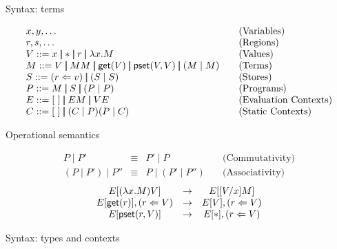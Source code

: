 \documentclass[11pt]{article}
\newcommand{\arrow}{\rightarrow}        \newcommand{\trarrow}{\stackrel{*}{\rightarrow}}        \newcommand{\limp}{\multimap} \newcommand{\bang}{\oc}
\newcommand{\pst}[2]{{\sf pset}(#1,#2)}
\newcommand{\get}[1]{{\sf get}(#1)}
\newcommand{\pstore}[2]{(#1 \Leftarrow #2)}
\begin{document}
\begin{table}
{\footnotesize
\begin{center}
{\sc Syntax: terms}
\end{center}
\[
\begin{array}{ll}

x,y,\ldots         
&\mbox{(Variables)} \\

r,s,\ldots         
&\mbox{(Regions)} \\

V::= x \Alt * \Alt r \Alt \lambda x.M
&\mbox{(Values)} \\

M::= V \Alt MM \Alt \get{V} \Alt \pst{V}{V} 
\Alt (M \mid M)\quad &\mbox{(Terms)} \\

S::= \pstore{r}{v} \Alt (S \mid S) &\mbox{(Stores)} \\

P::= M \Alt S \Alt (P\mid P) &\mbox{(Programs)}  \\

E::= [~] \Alt EM \Alt VE  &\mbox{(Evaluation Contexts)} \\

C::= [~] \Alt (C \mid P)  (P\mid C) &\mbox{(Static Contexts)}   

\end{array}
\]
\begin{center}
{\sc Operational semantics}
\end{center}
\[
\begin{array}{cccc}

P\mid P' &\equiv  &P' \mid P    &\mbox{(Commutativity)} \\
(P\mid P')\mid P'' &\equiv &P\mid (P' \mid P'')  \quad &\mbox{(Associativity)} 

\end{array}
\]
\[
\begin{array}{ccc}

E[(\lambda x.M)V]        &\arrow  &E[[V/x]M]  \\

E[\get{r}],\pstore{r}{V} &\arrow  &E[V],\pstore{r}{V} \\ 

E[\pst{r}{V}]            &\arrow  &E[*],\pstore{r}{V}

\end{array}
\]
\begin{center}
{\sc Syntax: types and contexts}
\end{center}
\[
\begin{array}{ll}


\end{array}\]}
\end{table}
\end{document}
